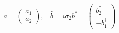 \begin{equation}
a = \left(
\begin{array}{c}
a_{1} \\  a_{2}
\end{array}     \right) ,~~~~ \hat{b} = i \sigma_{2} b^{*} = \left(
\begin{array}{c}
b_{2}^{\dag} \\ - b_{1}^{\dag}
\end{array}     \right)  
\end{equation}

